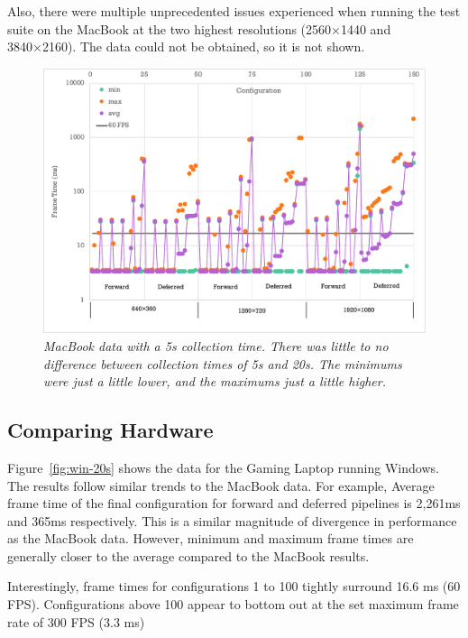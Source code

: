 \documentclass[11pt]{article}
\begin{document}
Also, there were multiple unprecedented issues experienced when running the test suite on the MacBook at the two highest resolutions (2560×1440 and 3840×2160).
The data could not be obtained, so it is not shown.

\begin{figure}[h!]
  \begin{center}
    \includegraphics[width=1\columnwidth]{../mac-5s.pdf}
  \end{center}
  \caption[MacBook Data]{
    \emph{
      MacBook data with a 5s collection time.
      There was little to no difference between collection times of 5s and 20s.
      The minimums were just a little lower, and the maximums just a little higher.
    }
  }\label{fig:mac-5s}
\end{figure}

\subsection{Comparing Hardware}
Figure~\ref{fig:win-20s} shows the data for the Gaming Laptop running Windows.
The results follow similar trends to the MacBook data.
For example, Average frame time of the final configuration for forward and deferred pipelines is 2,261ms and 365ms respectively.
This is a similar magnitude of divergence in performance as the MacBook data.
However, minimum and maximum frame times are generally closer to the average compared to the MacBook results.

Interestingly, frame times for configurations 1 to 100 tightly surround 16.6 ms (60 FPS).
Configurations above 100 appear to bottom out at the set maximum frame rate of 300 FPS (3.3 ms)
\end{document}
